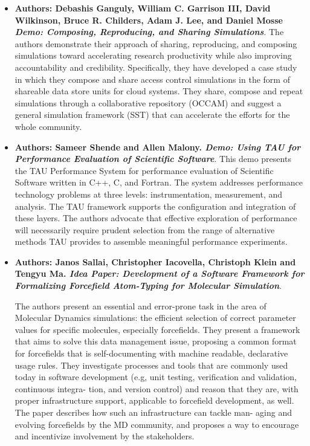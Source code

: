 \documentclass[11pt, oneside]{amsart}
\begin{document}
\begin{itemize}
\item \textbf{Authors: Debashis Ganguly, William C. Garrison III, David Wilkinson, Bruce R. Childers, Adam J. Lee, and Daniel Mosse \emph{Demo: Composing, Reproducing, and Sharing Simulations}}.
The authors demonstrate their approach of sharing,
reproducing, and composing simulations toward accelerating
research productivity while also improving accountability and
credibility. Specifically, they have developed a case study in
which they compose and share access control simulations in the
form of shareable data store units for cloud systems. They share, compose
and repeat simulations  through a collaborative repository
(OCCAM) and suggest a general simulation framework (SST) that can
accelerate the efforts for the whole community.

\item \textbf{Authors: Sameer Shende and Allen Malony. \emph{Demo: Using TAU for Performance Evaluation of Scientific Software}}.
This demo presents the  TAU Performance System for performance evaluation of Scientific 
Software written in C++, C, and Fortran. The system addresses performance 
technology problems  at three levels: instrumentation, 
measurement, and analysis. The TAU framework supports the 
configuration and integration of these layers. The authors advocate that effective 
exploration of performance will necessarily
require prudent selection from the range of alternative methods TAU provides 
to  assemble meaningful performance experiments.

\item \textbf{Authors: Janos Sallai, Christopher Iacovella, Christoph Klein and Tengyu Ma. \emph{Idea Paper: Development of a Software Framework for Formalizing Forcefield Atom-Typing for Molecular Simulation}}.

The authors present an essential and error-prone task in the area of Molecular Dynamics simulations: the efficient selection of correct parameter values for specific molecules, especially forcefields. They  present  a  framework  that  aims  to  solve  this
data  management  issue,  proposing  a  common  format  for
forcefields that is self-documenting with machine readable,
declarative usage rules. They investigate processes and tools
that are commonly used today in software development (e.g,
unit testing, verification and validation, continuous integra-
tion,  and  version  control)  and reason that they are, with proper infrastructure
support, applicable to forcefield development, as well. The
paper describes how such an infrastructure can tackle man-
aging and evolving forcefields by the MD community, and
proposes a way to encourage and incentivize involvement
by the stakeholders.


\end{itemize}
\end{document}
